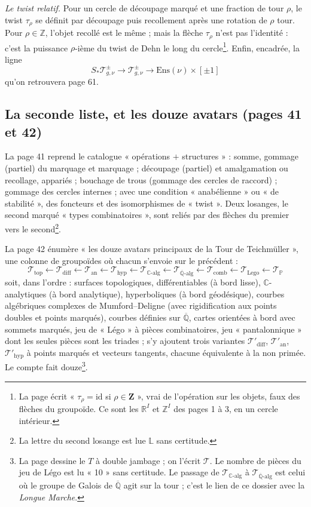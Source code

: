\documentclass[11pt,a4paper]{article}
\begin{document}
\emph{Le twist relatif.} Pour un cercle de découpage marqué et une fraction de
tour $\rho$, le twist $\tau_\rho$ se définit par découpage puis recollement
après une rotation de $\rho$ tour. Pour $\rho \in \mathbb{Z}$, l'objet recollé
est le même ; mais la flèche $\tau_\rho$ n'est pas l'identité : c'est la
puissance $\rho$-ième du twist de Dehn le long du cercle\footnote{La page écrit
« $\tau_\rho = \mathrm{id}$ si $\rho \in \mathbf{Z}$ », vrai de l'opération sur
les objets, faux des flèches du groupoïde. Ce sont les $\mathbb{R}^{I}$ et
$\mathbb{Z}^{I}$ des pages 1 à 3, en un cercle intérieur.}. Enfin, encadrée,
la ligne
\[
S_{*}\mathcal{T}^{\pm}_{g,\nu} \longrightarrow \mathcal{T}^{\pm}_{g,\nu}
\longrightarrow \mathrm{Ens}(\nu) \times [\pm 1]
\]
qu'on retrouvera page 61.

\subsection*{La seconde liste, et les douze avatars (pages 41 et 42)}

La page 41 reprend le catalogue « opérations $+$ structures » : somme, gommage
(partiel) du marquage et marquage ; découpage (partiel) et amalgamation ou
recollage, appariés ; bouchage de trous (gommage des cercles de raccord) ;
gommage des cercles internes ; avec une condition « anabélienne » ou « de
stabilité », des foncteurs et des isomorphismes de « twist ». Deux losanges, le
second marqué « types combinatoires », sont reliés par des flèches du premier
vers le second\footnote{La lettre du second losange est lue $\mathbb{L}$ sans
certitude.}.

La page 42 énumère « les douze avatars principaux de la Tour de Teichmüller »,
une colonne de groupoïdes où chacun s'envoie sur le précédent :
\[
\mathcal{T}_{\mathrm{top}} \leftarrow \mathcal{T}_{\mathrm{diff}} \leftarrow
\mathcal{T}_{\mathrm{an}} \leftarrow \mathcal{T}_{\mathrm{hyp}} \leftarrow
\mathcal{T}_{\mathbb{C}\text{-alg}} \leftarrow
\mathcal{T}_{\overline{\mathbb{Q}}\text{-alg}} \leftarrow
\mathcal{T}_{\mathrm{comb}} \leftarrow \mathcal{T}_{\mathrm{Lego}} \leftarrow
\mathcal{T}_{\mathbb{P}}
\]
soit, dans l'ordre : surfaces topologiques, différentiables (à bord lisse), $\mathbb{C}$-analytiques
(à bord analytique), hyperboliques (à bord géodésique), courbes algébriques
complexes de Mumford–Deligne (avec rigidification aux points doubles et points
marqués), courbes définies sur $\overline{\mathbb{Q}}$, cartes orientées à bord
avec sommets marqués, jeu de « Légo » à pièces combinatoires, jeu
« pantalonnique » dont les seules pièces sont les triades ; s'y ajoutent trois variantes
$\mathcal{T}'_{\mathrm{diff}}$, $\mathcal{T}'_{\mathrm{an}}$,
$\mathcal{T}'_{\mathrm{hyp}}$ à points marqués et vecteurs tangents, chacune
équivalente à la non primée. Le compte fait douze\footnote{La page dessine le
$T$ à double jambage ; on l'écrit $\mathcal{T}$. Le nombre de pièces du jeu de
Légo est lu « 10 » sans certitude. Le passage de $\mathcal{T}_{\mathbb{C}\text{-alg}}$
à $\mathcal{T}_{\overline{\mathbb{Q}}\text{-alg}}$ est celui où le groupe de Galois
de $\overline{\mathbb{Q}}$ agit sur la tour ; c'est le lien de ce dossier avec la
\emph{Longue Marche}.}.
\end{document}
